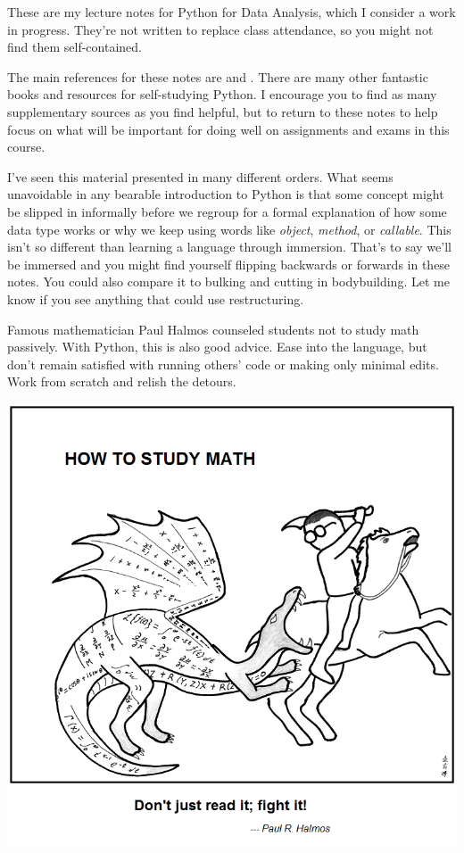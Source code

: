 These are my lecture notes for Python for Data Analysis, which I consider a work in progress. They're not written to replace class attendance, so you might not find them self-contained. 

The main references for these notes are \cite{lubanovic2019introducing} and \cite{vanderplas2016python}. There are many other fantastic books and resources for self-studying Python. I encourage you to find as many supplementary sources as you find helpful, but to return to these notes to help focus on what will be important for doing well on assignments and exams in this course. 

I've seen this material presented in many different orders. What seems unavoidable in any bearable introduction to Python is that some concept might be slipped in informally before we regroup for a formal explanation of how some data type works or why we keep using words like \emph{object}, \emph{method}, or \emph{callable}. This isn't so different than learning a language through immersion. That's to say we'll be immersed and you might find yourself flipping backwards or forwards in these notes. You could also compare it to bulking and cutting in bodybuilding. Let me know if you see anything that could use restructuring.  

Famous mathematician Paul Halmos counseled students not to study math passively. With Python, this is also good advice. Ease into the language, but don't remain satisfied with running others' code or making only minimal edits. Work from scratch and relish the detours. 

\begin{center}
\href{https://abstrusegoose.com/353}{\includegraphics[width = .51\textwidth]{HowMath.png}}

\vspace{-14pt}
\end{center}